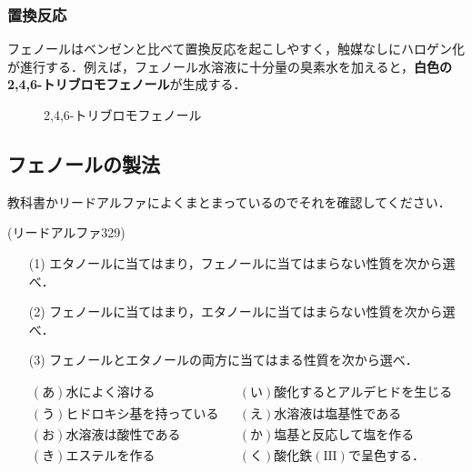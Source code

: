 \documentclass[a4paper,12pt]{ltjsreport}
\begin{document}
    \subsubsection{置換反応}
    フェノールはベンゼンと比べて置換反応を起こしやすく，触媒なしにハロゲン化が進行する．例えば，フェノール水溶液に十分量の臭素水を加えると，{\color{red}\textbf{白色の2,4,6-トリブロモフェノール}}が生成する．
    \begin{figure}[H]
    \centering
       \caption{2,4,6-トリブロモフェノール}
\end{figure}
\subsection{フェノールの製法}
教科書かリードアルファによくまとまっているのでそれを確認してください．
\newpage
\begin{que}
(リードアルファ329)
\begin{itemize}
    \item [(1)]エタノールに当てはまり，フェノールに当てはまらない性質を次から選べ．
\item [(2)]フェノールに当てはまり，エタノールに当てはまらない性質を次から選べ．
\item [(3)]フェノールとエタノールの両方に当てはまる性質を次から選べ．
\end{itemize}
\begin{align*}
&(あ)水によく溶ける&&(い)酸化するとアルデヒドを生じる\\
&(う)ヒドロキシ基を持っている&&(え)水溶液は塩基性である\\
&(お)水溶液は酸性である&&(か)塩基と反応して塩を作る\\
&(き)エステルを作る&&(く)酸化鉄(\text{III})で呈色する．
\end{align*}
\end{que}
\ans 
\newpage
\end{document}
